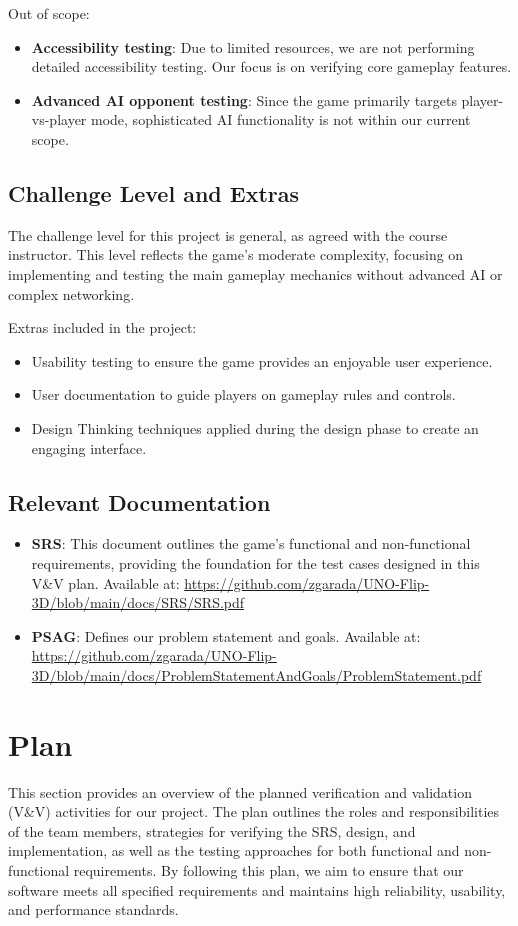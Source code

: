 \documentclass[12pt, titlepage]{article}
\begin{document}
Out of scope:

\begin{itemize}
    \item \textbf{Accessibility testing}: Due to limited resources, we are not performing detailed accessibility testing. Our focus is on verifying core gameplay features.
    \item \textbf{Advanced AI opponent testing}: Since the game primarily targets player-vs-player mode, sophisticated AI functionality is not within our current scope.
\end{itemize}

\subsection{Challenge Level and Extras}
The challenge level for this project is general, as agreed with the course instructor. This level reflects the game’s moderate complexity, focusing on implementing and testing the main gameplay mechanics without advanced AI or complex networking.

Extras included in the project:
\begin{itemize}
    \item Usability testing to ensure the game provides an enjoyable user experience.
    \item User documentation to guide players on gameplay rules and controls.
    \item Design Thinking techniques applied during the design phase to create an engaging interface.
\end{itemize}

\subsection{Relevant Documentation}
\begin{itemize}
    \item \textbf{SRS}: This document outlines the game's functional and non-functional requirements, providing the foundation for the test cases designed in this V\&V plan. Available at: \url{https://github.com/zgarada/UNO-Flip-3D/blob/main/docs/SRS/SRS.pdf}
    \item \textbf{PSAG}: Defines our problem statement and goals. Available at: \url{https://github.com/zgarada/UNO-Flip-3D/blob/main/docs/ProblemStatementAndGoals/ProblemStatement.pdf}
\end{itemize}

\section{Plan}
This section provides an overview of the planned verification and validation (V\&V) activities for our project. The plan outlines the roles and responsibilities of the team members, strategies for verifying the SRS, design, and implementation, as well as the testing approaches for both functional and non-functional requirements. By following this plan, we aim to ensure that our software meets all specified requirements and maintains high reliability, usability, and performance standards.
\end{document}

